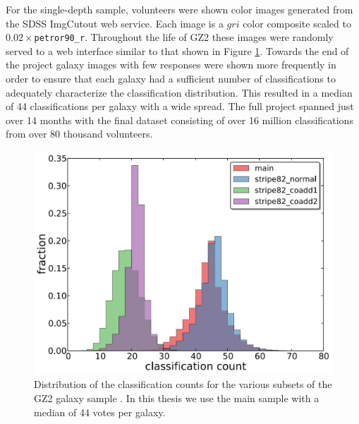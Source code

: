 For the single-depth sample, volunteers were shown color images generated from the SDSS ImgCutout web service. Each image is a $gri$ color composite scaled to $0.02\times$\texttt{petror90\_r}. Throughout the life of GZ2 these images were randomly served to a web interface similar to that shown in Figure \ref{fig: gz2 interface}. Towards the end of the project galaxy images with few responses were shown more frequently in order to ensure that each galaxy had a sufficient number of classifications to adequately characterize the classification distribution. This resulted in a median of 44 classifications per galaxy with a wide spread. The full project spanned just over 14 months with the final dataset consisting of over 16 million classifications from over 80 thousand volunteers. 
 
\begin{figure}[h!]
\includegraphics[width=\textwidth]{Figures/GZ2_classification_count.png}
\caption[Galaxy Zoo 2 classification count distributions]{Distribution of the classification counts for the various subsets of the GZ2 galaxy sample \citep[credit:][]{Willett2013}. In this thesis we use the main sample with a median of 44 votes per galaxy.}
\label{fig: gz2 interface}
\end{figure}

